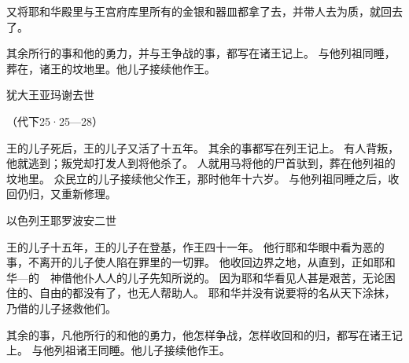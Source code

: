 {又将耶和华殿里与王宫府库里所有的金银和器皿都拿了去，并带人去为质，就回{}去了。
\par }{\PP {}其余所行的事和他的勇力，并与{}王{}争战的事，都写在{}诸王记上。
与他列祖同睡，葬在{}，{}诸王的坟地里。他儿子{}接续他作王。
\par }{\SH 犹大王亚玛谢去世
\par }{\R （代下25·25—28）
\par }{\PP {}王{}的儿子{}死后，{}王{}的儿子{}又活了十五年。
其余的事都写在{}列王记上。
有人背叛{}，他就逃到{}；叛党却打发人到{}将他杀了。
人就用马将他的尸首驮到{}，葬在{}他列祖的坟地里。
众民立{}的儿子{}接续他父作王，那时他年十六岁。
与他列祖同睡之后，{}收回{}仍归{}，又重新修理。
\par }{\SH 以色列王耶罗波安二世
\par }{\PP {}王{}的儿子{}十五年，{}王{}的儿子{}在{}登基，作王四十一年。
他行耶和华眼中看为恶的事，不离开{}的儿子{}使{}人陷在罪里的一切罪。
他收回{}边界之地，从{}直到{}，正如耶和华—{}的　神借他仆人{}人{}的儿子先知{}所说的。
因为耶和华看见{}人甚是艰苦，无论困住的、自由的都没有了，也无人帮助{}人。
耶和华并没有说要将{}的名从天下涂抹，乃借{}的儿子{}拯救他们。
\par }{\PP {}其余的事，凡他所行的和他的勇力，他怎样争战，怎样收回{}和{}{}的{}归{}，都写在{}诸王记上。
与他列祖{}诸王同睡。他儿子{}接续他作王。

}
